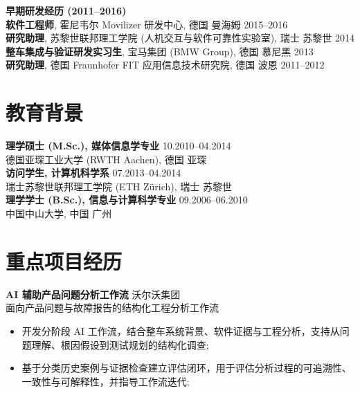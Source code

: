 \documentclass[11pt]{article}
\begin{document}
\vspace{3pt}
\noindent\textbf{早期研发经历 (2011--2016)}\\
\textbf{软件工程师}, 霍尼韦尔 Movilizer 研发中心, 德国 曼海姆 \hfill 2015--2016\\
\textbf{研究助理}, 苏黎世联邦理工学院 (人机交互与软件可靠性实验室), 瑞士 苏黎世 \hfill 2014\\
\textbf{整车集成与验证研发实习生}, 宝马集团 (BMW Group), 德国 慕尼黑 \hfill 2013\\
\textbf{研究助理}, 德国 Fraunhofer FIT 应用信息技术研究院, 德国 波恩 \hfill 2011--2012


\section{教育背景}

\noindent\textbf{理学硕士 (M.Sc.), 媒体信息学专业} \hfill 10.2010--04.2014\\
德国亚琛工业大学 (RWTH Aachen), 德国 亚琛\\[2pt]
\textbf{访问学生, 计算机科学系} \hfill 07.2013--04.2014\\
瑞士苏黎世联邦理工学院 (ETH Zürich), 瑞士 苏黎世\\[2pt]
\textbf{理学学士 (B.Sc.), 信息与计算科学专业} \hfill 09.2006--06.2010\\
中国中山大学, 中国 广州


\section{重点项目经历}

\noindent\textbf{AI 辅助产品问题分析工作流} \hfill 沃尔沃集团\\
面向产品问题与故障报告的结构化工程分析工作流
\begin{itemize}
    \item 开发分阶段 AI 工作流，结合整车系统背景、软件证据与工程分析，支持从问题理解、根因假设到测试规划的结构化调查;
    \item 基于分类历史案例与证据检查建立评估闭环，用于评估分析过程的可追溯性、一致性与可解释性，并指导工作流迭代;
\end{itemize}
\end{document}
